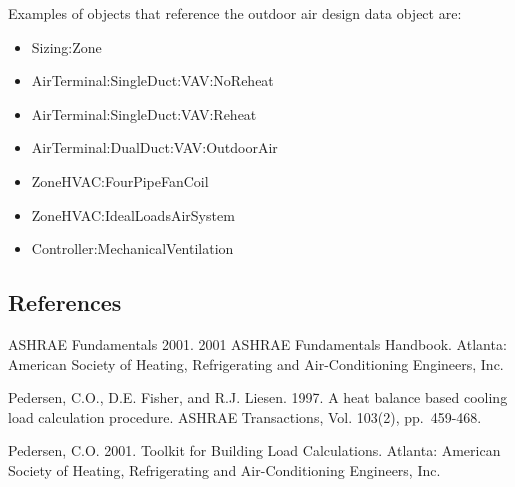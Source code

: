 Examples of objects that reference the outdoor air design data object are:

\begin{itemize}
\item
  Sizing:Zone
\item
  AirTerminal:SingleDuct:VAV:NoReheat
\item
  AirTerminal:SingleDuct:VAV:Reheat
\item
  AirTerminal:DualDuct:VAV:OutdoorAir
\item
  ZoneHVAC:FourPipeFanCoil
\item
  ZoneHVAC:IdealLoadsAirSystem
\item
  Controller:MechanicalVentilation
\end{itemize}

\subsection{References}\label{references-058}

ASHRAE Fundamentals 2001. 2001 ASHRAE Fundamentals Handbook. Atlanta: American Society of Heating, Refrigerating and Air-Conditioning Engineers, Inc.

Pedersen, C.O., D.E. Fisher, and R.J. Liesen. 1997. A heat balance based cooling load calculation procedure. ASHRAE Transactions, Vol. 103(2), pp.~459-468.

Pedersen, C.O. 2001. Toolkit for Building Load Calculations. Atlanta: American Society of Heating, Refrigerating and Air-Conditioning Engineers, Inc.
